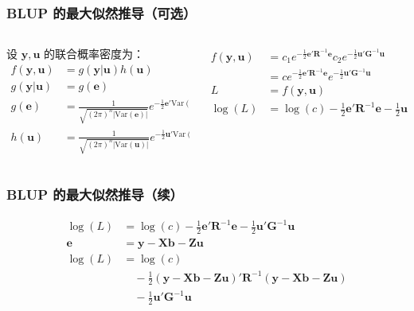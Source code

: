 \documentclass[serif,aspectratio=169]{beamer}
\begin{document}
\begin{frame}
  \frametitle{BLUP 的最大似然推导（可选）}
  \begin{columns}
    \begin{column}{.5\textwidth}
      设 $\mathbf{y,u}$ 的联合概率密度为：
      \begin{align*}
        f(\mathbf{y,u}) &=g(\mathbf{y|u})h(\mathbf{u})\\
        g(\mathbf{y|u}) &=g(\mathbf{e})\\
        g(\mathbf{e}) &=\frac{1}{\sqrt{(2\pi)^n|\mathrm{Var}(\mathbf{e})|}}e^{-\frac{1}{2}\mathbf{e}'\mathrm{Var}(\mathbf{e})^{-1}\mathbf{e}}\\
        h(\mathbf{u}) &=\frac{1}{\sqrt{(2\pi)^n|\mathrm{Var}(\mathbf{u})|}}e^{-\frac{1}{2}\mathbf{u}'\mathrm{Var}(\mathbf{u})^{-1}\mathbf{u}}
      \end{align*}
    \end{column}

    \begin{column}{.5\textwidth}
      \begin{align*}
        f(\mathbf{y,u}) & = c_1e^{-\frac{1}{2}\mathbf{e}'\mathbf{R}^{-1}\mathbf{e}}c_2e^{-\frac{1}{2}\mathbf{u}'\mathbf{G}^{-1}\mathbf{u}}\\
        & = ce^{-\frac{1}{2}\mathbf{e}'\mathbf{R}^{-1}\mathbf{e}}e^{-\frac{1}{2}\mathbf{u}'\mathbf{G}^{-1}\mathbf{u}}\\
        L &= f(\mathbf{y,u})\\
        \log(L) &=\log(c)-\frac{1}{2}\mathbf{e}'\mathbf{R}^{-1}\mathbf{e}-\frac{1}{2}\mathbf{u}'\mathbf{G}^{-1}\mathbf{u}
      \end{align*}
    \end{column}
  \end{columns}
\end{frame}


\begin{frame}
  \frametitle{BLUP 的最大似然推导（续）}
  \begin{align*}
    \log(L) &=\log(c)-\frac{1}{2}\mathbf{e}'\mathbf{R}^{-1}\mathbf{e}-\frac{1}{2}\mathbf{u}'\mathbf{G}^{-1}\mathbf{u}\\
    \mathbf{e} &=\mathbf{y-Xb-Zu}\\
    \log(L) &=\log(c)\\
    &\quad-\frac{1}{2}(\mathbf{y-Xb-Zu})'\mathbf{R}^{-1}(\mathbf{y-Xb-Zu})\\
    &\quad-\frac{1}{2}\mathbf{u}'\mathbf{G}^{-1}\mathbf{u}\\
  \end{align*}
\end{frame}
\end{document}
